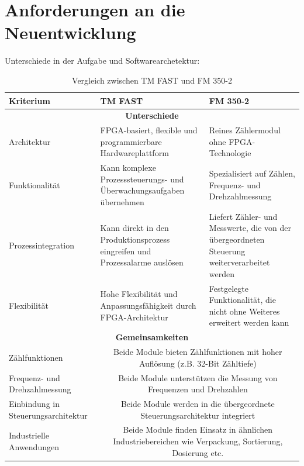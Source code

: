 \section{Anforderungen an die Neuentwicklung} 



Unterschiede in der Aufgabe und Softwarearchetektur:

\begin{table}[h]
    \centering
    \renewcommand{\arraystretch}{1.3}
    \begin{tabularx}{\textwidth}{|X|X|X|}
        \hline
        \textbf{Kriterium} & \textbf{TM FAST} & \textbf{FM 350-2} \\
        \hline
        \multicolumn{3}{|c|}{\textbf{Unterschiede}} \\
        \hline
        Architektur & FPGA-basiert, flexible und programmierbare Hardwareplattform & Reines Zählermodul ohne FPGA-Technologie \\
        \hline
        Funktionalität & Kann komplexe Prozesssteuerungs- und Überwachungsaufgaben übernehmen & Spezialisiert auf Zählen, Frequenz- und Drehzahlmessung \\
        \hline
        Prozessintegration & Kann direkt in den Produktionsprozess eingreifen und Prozessalarme auslösen & Liefert Zähler- und Messwerte, die von der übergeordneten Steuerung weiterverarbeitet werden \\
        \hline
        Flexibilität & Hohe Flexibilität und Anpassungsfähigkeit durch FPGA-Architektur & Festgelegte Funktionalität, die nicht ohne Weiteres erweitert werden kann \\
        \hline
        \multicolumn{3}{|c|}{\textbf{Gemeinsamkeiten}} \\
        \hline
        Zählfunktionen & \multicolumn{2}{c|}{Beide Module bieten Zählfunktionen mit hoher Auflösung (z.B. 32-Bit Zähltiefe)} \\
        \hline
        Frequenz- und Drehzahlmessung & \multicolumn{2}{c|}{Beide Module unterstützen die Messung von Frequenzen und Drehzahlen} \\
        \hline
        Einbindung in Steuerungsarchitektur & \multicolumn{2}{c|}{Beide Module werden in die übergeordnete Steuerungsarchitektur integriert} \\
        \hline
        Industrielle Anwendungen & \multicolumn{2}{c|}{Beide Module finden Einsatz in ähnlichen Industriebereichen wie Verpackung, Sortierung, Dosierung etc.} \\
        \hline
    \end{tabularx}
    \caption{Vergleich zwischen TM FAST und FM 350-2}
    \label{tab:tm_fast_vs_fm350-2}
\end{table}

